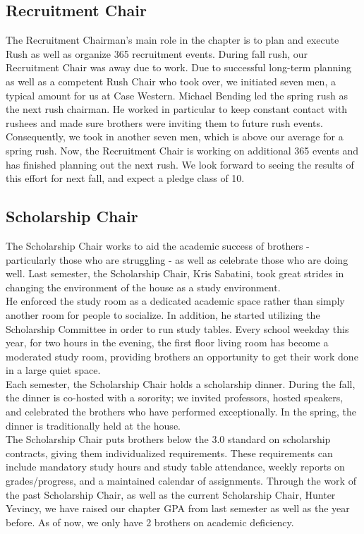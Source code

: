       \subsection*{Recruitment Chair}
	The Recruitment Chairman's main role in the chapter is to plan and execute Rush as well as organize 365 recruitment events. During fall rush, our Recruitment Chair was away due to work. Due to successful long-term planning as well as a competent Rush Chair who took over, we initiated seven men, a typical amount for us at Case Western. Michael Bending led the spring rush as the next rush chairman. He worked in particular to keep constant contact with rushees and made sure brothers were inviting them to future rush events. Consequently, we took in another seven men, which is above our average for a spring rush. Now, the Recruitment Chair is working on additional 365 events and has finished planning out the next rush. We look forward to seeing the results of this effort for next fall, and expect a pledge class of 10.
	
      \subsection*{Scholarship Chair}
	The Scholarship Chair works to aid the academic success of brothers - particularly those who are struggling - as well as celebrate those who are doing well. Last semester, the Scholarship Chair, Kris Sabatini, took great strides in changing the environment of the house as a study environment. \\

	He enforced the study room as a dedicated academic space rather than simply another room for people to socialize. In addition, he started utilizing the Scholarship Committee in order to run study tables. Every school weekday this year, for two hours in the evening, the first floor living room has become a moderated study room, providing brothers an opportunity to get their work done in a large quiet space. \\

	Each semester, the Scholarship Chair holds a scholarship dinner. During the fall, the dinner is co-hosted with a sorority; we invited professors, hosted speakers, and celebrated the brothers who have performed exceptionally. In the spring, the dinner is traditionally held at the house. \\

	The Scholarship Chair puts brothers below the 3.0 standard on scholarship contracts, giving them individualized requirements. These requirements can include mandatory study hours and study table attendance, weekly reports on grades/progress, and a maintained calendar of assignments. Through the work of the past Scholarship Chair, as well as the current Scholarship Chair, Hunter Yevincy, we have raised our chapter GPA from last semester as well as the year before. As of now, we only have 2 brothers on academic deficiency. 
	
